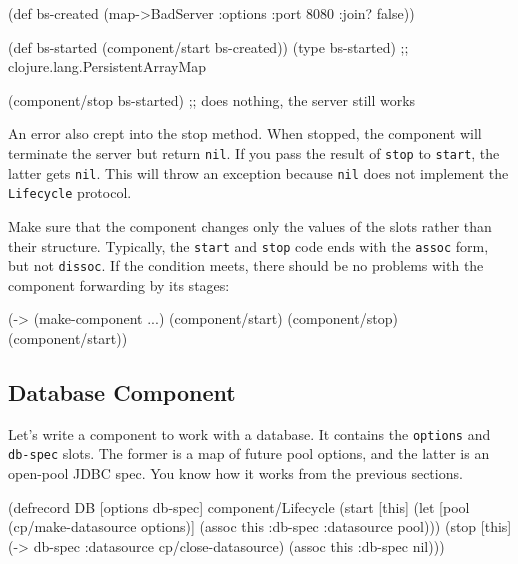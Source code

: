 \else

\begin{english}
  \begin{clojure}
(def bs-created (map->BadServer
                  {:options {:port 8080 :join? false}}))

(def bs-started (component/start bs-created))
(type bs-started)
;; clojure.lang.PersistentArrayMap

(component/stop bs-started)
;; does nothing, the server still works
  \end{clojure}
\end{english}

\fi

An error also crept into the stop method. When stopped, the component will terminate the server but return \verb|nil|. If you pass the result of \verb|stop| to \verb|start|, the latter gets \verb|nil|. This will throw an exception because \verb|nil| does not implement the \verb|Lifecycle| protocol.


Make sure that the component changes only the values of the slots rather than their structure. Typically, the \verb|start| and \verb|stop| code ends with the \verb|assoc| form, but not \verb|dissoc|. If the condition meets, there should be no problems with the component forwarding by its stages:

\begin{english}
  \begin{clojure}
(-> (make-component {...})
    (component/start)
    (component/stop)
    (component/start))
  \end{clojure}
\end{english}


\subsection{Database Component}

Let's write a component to work with a database. It contains the \verb|options| and \verb|db-spec| slots. The former is a map of future pool options, and the latter is an open-pool JDBC spec. You know how it works from the previous sections.

\ifnarrow

\begin{english}
  \begin{clojure}
(defrecord DB [options db-spec]
  component/Lifecycle
  (start [this]
    (let [pool (cp/make-datasource
                 options)]
      (assoc this :db-spec
        {:datasource pool})))
  (stop [this]
    (-> db-spec
        :datasource
        cp/close-datasource)
    (assoc this :db-spec nil)))
  \end{clojure}
\end{english}

